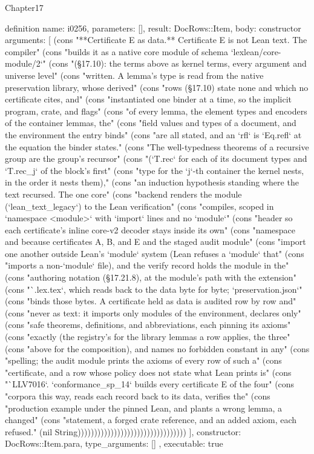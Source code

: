 \begin{lexlean}{Chapter17}
\begin{semanticmodule}
definition{
  name: i0256,
  parameters: [],
  result: DocRows::Item,
  body: constructor{
    arguments: [
      (cons "**Certificate E as data.** Certificate E is not Lean text. The compiler" (cons "builds it as a native core module of schema `lexlean/core-module/2`" (cons "(§17.10): the terms above as kernel terms, every argument and universe level" (cons "written. A lemma's type is read from the native preservation library, whose derived" (cons "rows (§17.10) state none and which no certificate cites, and" (cons "instantiated one binder at a time, so the implicit program, crate, and flags" (cons "of every lemma, the element types and encoders of the container lemmas, the" (cons "field values and types of a document, and the environment the entry binds" (cons "are all stated, and an `rfl` is `Eq.refl` at the equation the binder states." (cons "The well-typedness theorems of a recursive group are the group's recursor" (cons "(`T.rec` for each of its document types and `T.rec_j` of the block's first" (cons "type for the `j`-th container the kernel nests, in the order it nests them)," (cons "an induction hypothesis standing where the text recursed. The one core" (cons "backend renders the module (`lean_text_legacy`) to the Lean verification" (cons "compiles, scoped in `namespace <module>` with `import` lines and no `module`" (cons "header so each certificate's inline core-v2 decoder stays inside its own" (cons "namespace and because certificates A, B, and E and the staged audit module" (cons "import one another outside Lean's `module` system (Lean refuses a `module` that" (cons "imports a non-`module` file), and the verify record holds the module in the" (cons "authoring notation (§17.21.8), at the module's path with the extension" (cons "`.lex.tex`, which reads back to the data byte for byte; `preservation.json`" (cons "binds those bytes. A certificate held as data is audited row by row and" (cons "never as text: it imports only modules of the environment, declares only" (cons "safe theorems, definitions, and abbreviations, each pinning its axioms" (cons "exactly (the registry's for the library lemmas a row applies, the three" (cons "above for the composition), and names no forbidden constant in any" (cons "spelling; the audit module prints the axioms of every row of such a" (cons "certificate, and a row whose policy does not state what Lean prints is" (cons "`LLV7016`. `conformance_sp_14` builds every certificate E of the four" (cons "corpora this way, reads each record back to its data, verifies the" (cons "production example under the pinned Lean, and plants a wrong lemma, a changed" (cons "statement, a forged crate reference, and an added axiom, each refused." (nil String)))))))))))))))))))))))))))))))))
    ],
    constructor: DocRows::Item.para,
    type_arguments: []
  },
  executable: true
}


\end{semanticmodule}
\end{lexlean}
